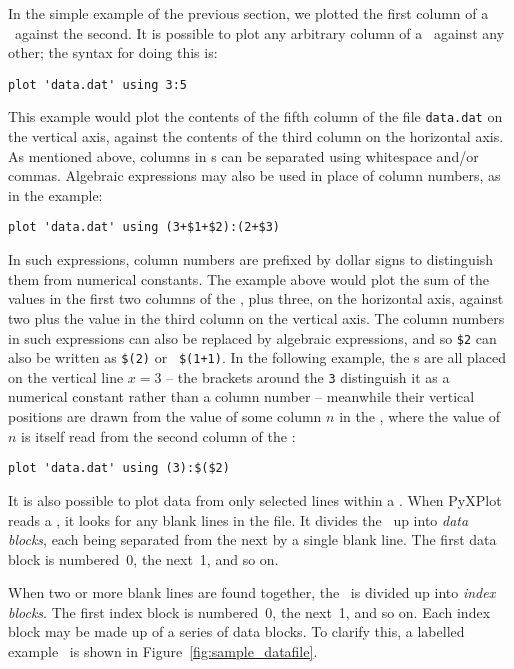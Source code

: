 In the simple example of the previous section, we plotted the first column of a
\datafile\ against the second. It is possible to plot any arbitrary column of a
\datafile\ against any other; the syntax for doing this is:

\begin{verbatim}
plot 'data.dat' using 3:5
\end{verbatim}

\noindent This example would plot the contents of the fifth column of the file
{\tt data.dat} on the vertical axis, against the contents of the third column
on the horizontal axis. As mentioned above, columns in \datafile s can be
separated using whitespace and/or commas.  Algebraic expressions may also be
used in place of column numbers, as in the example:

\begin{verbatim}
plot 'data.dat' using (3+$1+$2):(2+$3)
\end{verbatim}

\noindent In such expressions, column numbers are prefixed by dollar signs to
distinguish them from numerical constants. The example above would plot the sum
of the values in the first two columns of the \datafile, plus three, on the
horizontal axis, against two plus the value in the third column on the vertical
axis. The column numbers in such expressions can also be replaced by algebraic
expressions, and so {\tt \$2} can also be written as {\tt \$(2)} or {\tt
\$(1+1)}. In the following example, the \datapoint s are all placed on the
vertical line $x=3$ -- the brackets around the {\tt 3} distinguish it as a
numerical constant rather than a column number -- meanwhile their vertical
positions are drawn from the value of some column $n$ in the \datafile, where
the value of $n$ is itself read from the second column of the \datafile:

\begin{verbatim}
plot 'data.dat' using (3):$($2)
\end{verbatim}

It is also possible to plot data from only selected lines within a \datafile.
When PyXPlot reads a \datafile, it looks for any blank lines in the file. It
divides the \datafile\ up into {\it data blocks}, each being separated from the
next by a single blank line. The first data block is numbered~0, the next~1, and
so on.  

When two or more blank lines are found together, the \datafile\ is divided up
into {\it index blocks}. The first index block is numbered~0, the next~1, and
so on. Each index block may be made up of a series of data blocks. To clarify
this, a labelled example \datafile\ is shown in
Figure~\ref{fig:sample_datafile}.

